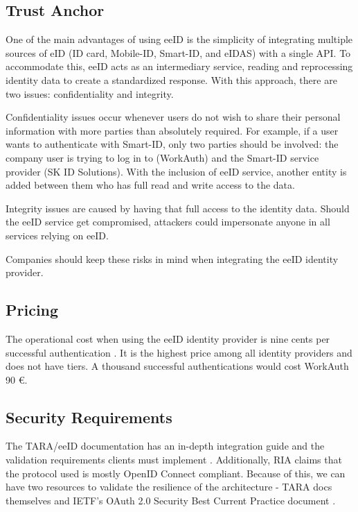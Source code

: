 \subsection{Trust Anchor}

One of the main advantages of using eeID is the simplicity of integrating multiple sources of eID (ID card, Mobile-ID, Smart-ID, and eIDAS) with a single API. To accommodate this, eeID acts as an intermediary service, reading and reprocessing identity data to create a standardized response. With this approach, there are two issues: confidentiality and integrity.

Confidentiality issues occur whenever users do not wish to share their personal information with more parties than absolutely required. For example, if a user wants to authenticate with Smart-ID, only two parties should be involved: the company user is trying to log in to (WorkAuth) and the Smart-ID service provider (SK ID Solutions). With the inclusion of eeID service, another entity is added between them who has full read and write access to the data.

Integrity issues are caused by having that full access to the identity data. Should the eeID service get compromised, attackers could impersonate anyone in all services relying on eeID.

Companies should keep these risks in mind when integrating the eeID identity provider.

\subsection{Pricing}

The operational cost when using the eeID identity provider is nine cents per successful authentication \cite{eeid-pricing}. It is the highest price among all identity providers and does not have tiers. A thousand successful authentications would cost WorkAuth 90 €.

\subsection{Security Requirements}

The TARA/eeID documentation has an in-depth integration guide and the validation requirements clients must implement \cite{tara-technical}. Additionally, RIA claims that the protocol used is mostly OpenID Connect compliant. Because of this, we can have two resources to validate the resilience of the architecture - TARA docs themselves \cite{tara-technical} and IETF's OAuth 2.0 Security Best Current Practice document \cite{ietf-oauth-security-topics-19}.

